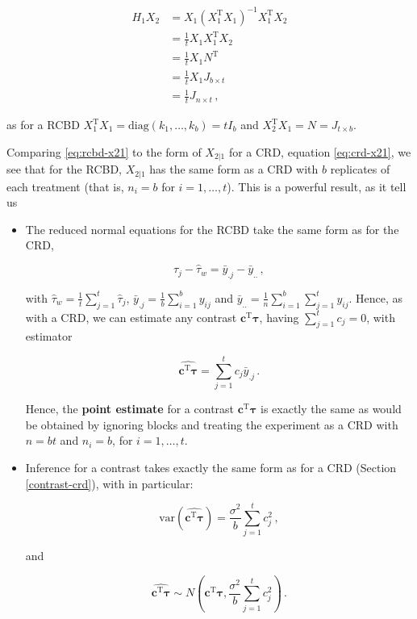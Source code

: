 \documentclass[
]{book}
\theoremstyle{definition}
\theoremstyle{definition}
\theoremstyle{definition}
\theoremstyle{definition}
\theoremstyle{remark}
\begin{document}
\begin{align}
H_1X_2 & = X_1(X_1^{\mathrm{T}}X_1)^{-1}X_1^{\mathrm{T}}X_2 \\
& = \frac{1}{t}X_1X_1^{\mathrm{T}}X_2 \\
& = \frac{1}{t}X_1N^{\mathrm{T}} \\
& = \frac{1}{t}X_1J_{b\times t} \\
& = \frac{1}{t}J_{n\times t}\,,
\end{align}

as for a RCBD \(X_1^{\mathrm{T}}X_1 = \mathrm{diag}(k_1,\ldots, k_b) = tI_b\) and \(X_2^{\mathrm{T}}X_1 = N = J_{t\times b}\).

Comparing \eqref{eq:rcbd-x21} to the form of \(X_{2|1}\) for a CRD, equation \eqref{eq:crd-x21}, we see that for the RCBD, \(X_{2|1}\) has the same form as a CRD with \(b\) replicates of each treatment (that is, \(n_i = b\) for \(i=1,\ldots, t\)). This is a powerful result, as it tell us

\begin{itemize}
\item
  The reduced normal equations for the RCBD take the same form as for the CRD,

  \[
    \hat{\tau}_j - \hat{\tau}_w = \bar{y}_{.j} - \bar{y}_{..}\,,
  \]

  with \(\hat{\tau}_w = \frac{1}{t}\sum_{j=1}^t\hat{\tau}_j\), \(\bar{y}_{.j} = \frac{1}{b}\sum_{i=1}^b y_{ij}\) and \(\bar{y}_{..} = \frac{1}{n}\sum_{i=1}^b\sum_{j=1}^t y_{ij}\). Hence, as with a CRD, we can estimate any contrast \(\boldsymbol{c}^{\mathrm{T}}\boldsymbol{\tau}\), having \(\sum_{j=1}^tc_j = 0\), with estimator

  \[
  \widehat{\boldsymbol{c}^{\mathrm{T}}\boldsymbol{\tau}} = \sum_{j=1}^tc_j\bar{y}_{.j}\,.
  \]

  Hence, the \textbf{point estimate} for a contrast \(\boldsymbol{c}^{\mathrm{T}}\boldsymbol{\tau}\) is exactly the same as would be obtained by ignoring blocks and treating the experiment as a CRD with \(n = bt\) and \(n_i = b\), for \(i=1,\ldots, t\).
\item
  Inference for a contrast takes exactly the same form as for a CRD (Section \ref{contrast-crd}), with in particular:

  \[
  \mathrm{var}\left(\widehat{\boldsymbol{c}^{\mathrm{T}}\boldsymbol{\tau}}\right) = \frac{\sigma^2}{b}\sum_{j=1}^tc_j^2\,,
  \]

  and

  \[
    \widehat{\boldsymbol{c}^{\mathrm{T}}\boldsymbol{\tau}} \sim N\left(\boldsymbol{c}^{\mathrm{T}}\boldsymbol{\tau}, \frac{\sigma^2}{b}\sum_{j=1}^t c_j^2\right)\,.
  \]
\end{itemize}
\end{document}
